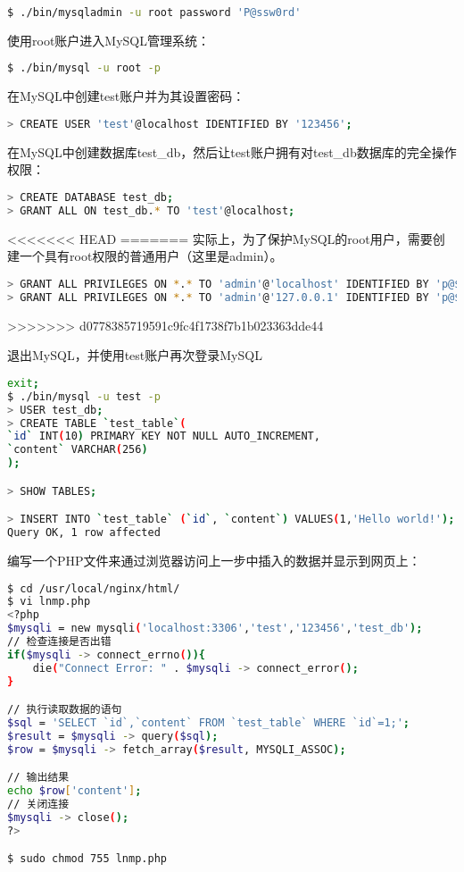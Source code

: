 \begin{lstlisting}[language=bash]
$ ./bin/mysqladmin -u root password 'P@ssw0rd'
\end{lstlisting}

使用root账户进入MySQL管理系统：

\begin{lstlisting}[language=bash]
$ ./bin/mysql -u root -p
\end{lstlisting}

在MySQL中创建test账户并为其设置密码：

\begin{lstlisting}[language=bash]
> CREATE USER 'test'@localhost IDENTIFIED BY '123456';
\end{lstlisting}

在MySQL中创建数据库test\_db，然后让test账户拥有对test\_db数据库的完全操作权限：


\begin{lstlisting}[language=bash]
> CREATE DATABASE test_db;
> GRANT ALL ON test_db.* TO 'test'@localhost;
\end{lstlisting}

<<<<<<< HEAD
=======
实际上，为了保护MySQL的root用户，需要创建一个具有root权限的普通用户（这里是admin）。


\begin{lstlisting}[language=bash]
> GRANT ALL PRIVILEGES ON *.* TO 'admin'@'localhost' IDENTIFIED BY 'p@$$word';
> GRANT ALL PRIVILEGES ON *.* TO 'admin'@'127.0.0.1' IDENTIFIED BY 'p@$$word';
\end{lstlisting}


>>>>>>> d0778385719591c9fc4f1738f7b1b023363dde44


退出MySQL，并使用test账户再次登录MySQL

\begin{lstlisting}[language=bash]
exit;
$ ./bin/mysql -u test -p
> USER test_db;
> CREATE TABLE `test_table`(
`id` INT(10) PRIMARY KEY NOT NULL AUTO_INCREMENT,
`content` VARCHAR(256)
);

> SHOW TABLES;

> INSERT INTO `test_table` (`id`, `content`) VALUES(1,'Hello world!');
Query OK, 1 row affected
\end{lstlisting}

编写一个PHP文件来通过浏览器访问上一步中插入的数据并显示到网页上：


\begin{lstlisting}[language=bash]
$ cd /usr/local/nginx/html/
$ vi lnmp.php
<?php
$mysqli = new mysqli('localhost:3306','test','123456','test_db');
// 检查连接是否出错
if($mysqli -> connect_errno()){
	die("Connect Error: " . $mysqli -> connect_error();
}

// 执行读取数据的语句
$sql = 'SELECT `id`,`content` FROM `test_table` WHERE `id`=1;';
$result = $mysqli -> query($sql);
$row = $mysqli -> fetch_array($result, MYSQLI_ASSOC);

// 输出结果
echo $row['content'];
// 关闭连接
$mysqli -> close();
?>

$ sudo chmod 755 lnmp.php
\end{lstlisting}


